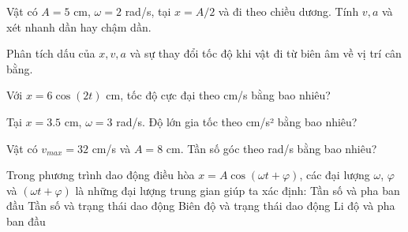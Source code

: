 \begin{ex}
Vật có $A=5$ cm, $\omega=2$ rad/s, tại $x=A/2$ và đi theo chiều dương. Tính $v,a$ và xét nhanh dần hay chậm dần.
\choiceTF

\end{ex}

\begin{ex}
Phân tích dấu của $x,v,a$ và sự thay đổi tốc độ khi vật đi từ biên âm về vị trí cân bằng.
\choiceTF

\end{ex}

\begin{ex}
Với $x=6\cos(2t)$ cm, tốc độ cực đại theo cm/s bằng bao nhiêu?
\end{ex}

\begin{ex}
Tại $x=3.5$ cm, $\omega=3$ rad/s. Độ lớn gia tốc theo cm/s² bằng bao nhiêu?
\end{ex}

\begin{ex}
Vật có $v_{max}=32$ cm/s và $A=8$ cm. Tần số góc theo rad/s bằng bao nhiêu?
\end{ex}

\begin{ex}
Trong phương trình dao động điều hòa $x=A\cos(\omega t+\varphi)$, các đại lượng $\omega$, $\varphi$ và $(\omega t+\varphi)$ là những đại lượng trung gian giúp ta xác định:
\choiceTF
{\True Tần số và pha ban đầu}
{\True Tần số và trạng thái dao động}
{Biên độ và trạng thái dao động}
{Li độ và pha ban đầu}
\end{ex}

